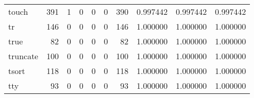 \begin{tabular}{lrrrrrrrrr}
touch     &                                                391 &                                                  1 &                                                  0 &                                                  0 &                                                  0 &                                                390 &                                           0.997442 &                               0.997442 &                             0.997442 \\
tr        &                                                146 &                                                  0 &                                                  0 &                                                  0 &                                                  0 &                                                146 &                                           1.000000 &                               1.000000 &                             1.000000 \\
true      &                                                 82 &                                                  0 &                                                  0 &                                                  0 &                                                  0 &                                                 82 &                                           1.000000 &                               1.000000 &                             1.000000 \\
truncate  &                                                100 &                                                  0 &                                                  0 &                                                  0 &                                                  0 &                                                100 &                                           1.000000 &                               1.000000 &                             1.000000 \\
tsort     &                                                118 &                                                  0 &                                                  0 &                                                  0 &                                                  0 &                                                118 &                                           1.000000 &                               1.000000 &                             1.000000 \\
tty       &                                                 93 &                                                  0 &                                                  0 &                                                  0 &                                                  0 &                                                 93 &                                           1.000000 &                               1.000000 &                             1.000000 \\

\end{tabular}
